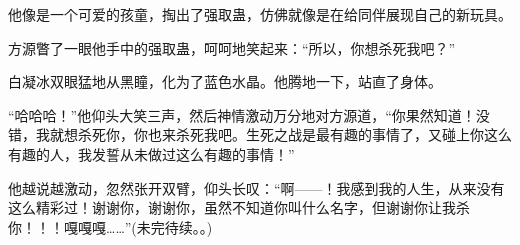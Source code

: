 \begin{this_body}
他像是一个可爱的孩童，掏出了强取蛊，仿佛就像是在给同伴展现自己的新玩具。

方源瞥了一眼他手中的强取蛊，呵呵地笑起来：“所以，你想杀死我吧？”

白凝冰双眼猛地从黑瞳，化为了蓝色水晶。他腾地一下，站直了身体。

“哈哈哈！”他仰头大笑三声，然后神情激动万分地对方源道，“你果然知道！没错，我就想杀死你，你也来杀死我吧。生死之战是最有趣的事情了，又碰上你这么有趣的人，我发誓从未做过这么有趣的事情！”

他越说越激动，忽然张开双臂，仰头长叹：“啊——！我感到我的人生，从来没有这么精彩过！谢谢你，谢谢你，虽然不知道你叫什么名字，但谢谢你让我杀你！！！嘎嘎嘎……”(未完待续。。)

\end{this_body}


